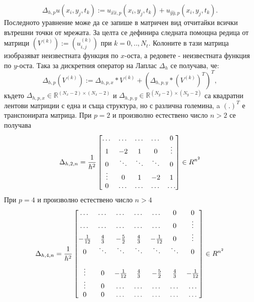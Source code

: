 \documentclass{article}
\newcommand{\be}{\begin{equation}}
\newcommand{\ee}{\end{equation}}
\newcommand{\RR}{\mathbb{R}}
\begin{document}
\be\label{deltaHSingle}
\Delta_{h,p} u(x_i, y_j, t_k) :=  u_{\widehat{xx},p}(x_i, y_j, t_k) + u_{\widehat{yy},p}(x_i, y_j, t_k).
\ee
Последното уравнение може да се запише в матричен вид отчитайки всички вътрешни точки от мрежата. За целта се дефинира следната помощна редица от матрици $\left(V^{(k)}\right) := (u_{i,j}^{(k)})$ при $k=0,..,N_t$. Колоните в тази матрица изобразяват неизвестната функция по $x$-оста, а редовете - неизвестната функция по $y$-оста. Така за дискретния оператор на Лаплас $\Delta_h$ се получава, че: 
\be\label{DeltaH}
\Delta_{h,p} (V^{(k)})  := \Delta_{h,p,x}*V^{(k)} + \left( \Delta_{h,p,y} * (V^{(k)})^T \right)^T,
\ee
където $\Delta_{h,p,x}\in \RR^{(N_x-2) \times (N_x-2)}$ и $\Delta_{h,p,y}\in \RR^{(N_y-2) \times (N_y-2)}$ са квадратни лентови матриции с една и съща структура, но с различна големина, a $(.)^T$ е транспонирата матрица. При $p=2$ и произволно естествено число $n>2$ се получава
\[
\Delta_{h,2,n} = \frac{1}{h^2}
\begin{bmatrix}
    \dots       & \dots        &     \dots   &   \dots        & 0   \\
    1               & -2            &   1           &   0               & \vdots    \\
        0           & \ddots        &    \ddots    &   \ddots       &  0 \\ 
    \vdots       &     0            &  1     	& -2    	   & 1 \\
    0               & \dots          &  \dots         & \dots  	   & \dots \\
\end{bmatrix}
\in \\R^{n^2}
\]
При $p=4$ и произволно естествено число $n>4$ 
\[
\Delta_{h,4,n} = \frac{1}{h^2}
\begin{bmatrix}
    \dots		& \dots            	& \dots		&   		 \dots  &    \dots      	   &   0           & 0    \\
    \dots    	           &\dots            	& \dots		&   		\dots   &   \dots      	   	   &   0	           & \vdots  \\
    -\frac{1}{12}	& \frac{4}{3}         	& -\frac{5}{2}	&  \frac{4}{3}    	 &   -\frac{1}{12}	  &      0           &\vdots    \\
        0           		& \ddots        	&    \ddots   		 &   \ddots      	 &     \ddots      	  &  \ddots        &    0 \\	
\\
   \vdots      		 & 0           		 &  -\frac{1}{12}	& \frac{4}{3}    	& -\frac{5}{2}	&  \frac{4}{3}  &   -\frac{1}{12} \\
    \vdots    		 & 0        		 &	 \dots     	&  \dots              	&\dots 		 &  \dots 	&\dots   	\\
    0              		 & 0        		 &	 \dots     	&  \dots             	 &\dots 		 &  \dots 	&\dots 	\\
\end{bmatrix}
\in \\R^{n^2}
\]
\end{document}
